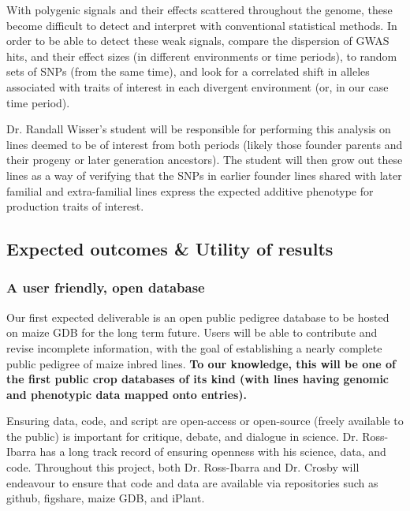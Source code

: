 \documentclass[12pt]{article}
\begin{document}
With polygenic signals and their effects scattered throughout the genome, these become difficult to detect and interpret with conventional statistical methods. 
In order to be able to detect these weak signals, \cite{Berg:2014bs} compare the dispersion of GWAS hits, and their effect sizes (in different environments or time periods), to random sets of SNPs (from the same time), and look for a correlated shift in alleles associated with traits of interest in each divergent environment (or, in our case time period).

Dr. Randall Wisser's student will be responsible for performing this analysis on lines deemed to be of interest from both periods (likely those founder parents and their progeny or later generation ancestors). 
The student will then grow out these lines as a way of verifying that the SNPs in earlier founder lines shared with later familial and extra-familial lines express the expected additive phenotype for production traits of interest. 



\subsection*{Expected outcomes \& Utility of results}

\subsubsection*{A user friendly, open database}

Our first expected deliverable is an open public pedigree database to be hosted on maize GDB for the long term future. Users will be able to contribute and revise incomplete information, with the goal of establishing a nearly complete public pedigree of maize inbred lines. \textbf{To our knowledge, this will be one of the first public crop databases of its kind (with lines having genomic and phenotypic data mapped onto entries).}

Ensuring data, code, and script are open-access or open-source (freely available to the public) is important for critique, debate, and dialogue in science. Dr. Ross-Ibarra has a long track record of ensuring openness with his science, data, and code. Throughout this project, both Dr. Ross-Ibarra and Dr. Crosby will endeavour to ensure that code and data are available via repositories such as github, figshare, maize GDB, and iPlant.
\end{document}
